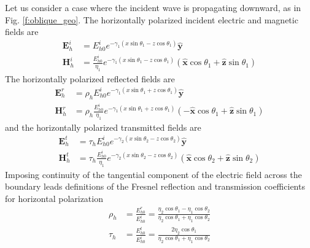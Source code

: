 \documentclass[11pt, oneside]{article}
\begin{document}
Let us consider a case where the incident wave is propagating downward, as in Fig. \ref{f:oblique_geo}. The horizontally polarized incident electric and magnetic fields are 
	\begin{subequations}
	\label{e:obliqueHi1}
	\begin{align}
	\mathbf{E}_h^i &=  E_{h0}^i e^{-\gamma_1\left(x\sin{\theta_1} - z\cos{\theta_1}\right)} \hat{\mathbf{y}} \\
	\mathbf{H}_h^i &= \frac{E_{h0}^i}{\eta_1}
				e^{-\gamma_1\left(x\sin{\theta_1} - z\cos{\theta_1}\right)}\left(\hat{\mathbf{x}}\cos{\theta_1} + \hat{\mathbf{z}}\sin{\theta_1}\right)
	\end{align}
	\end{subequations}
The horizontally polarized reflected fields are
	\begin{subequations}
	\label{e:obliqueHr1}
	\begin{align}
	\mathbf{E}_h^r &=  \rho_hE_{h0}^i e^{-\gamma_1\left(x\sin{\theta_1} + z\cos{\theta_1}\right)} \hat{\mathbf{y}} \\
	\mathbf{H}_h^r &= \rho_h\frac{E_{h0}^i}{\eta_1}
				e^{-\gamma_1\left(x\sin{\theta_1} + z\cos{\theta_1}\right)}\left(-\hat{\mathbf{x}}\cos{\theta_1} + \hat{\mathbf{z}}\sin{\theta_1}\right)
	\end{align}
	\end{subequations}
and the horizontally polarized transmitted fields are
	\begin{subequations}
	\label{e:obliqueHt1}
	\begin{align}
	\mathbf{E}_h^t &= \tau_h E_{h0}^i e^{-\gamma_2\left(x\sin{\theta_2} - z\cos{\theta_2}\right)}\hat{\mathbf{y}} \\
	\mathbf{H}_h^t &= \tau_h\frac{E_{h0}^i}{\eta_1}e^{-\gamma_2\left(x\sin{\theta_2} - z\cos{\theta_2}\right)}
					\left(\hat{\mathbf{x}}\cos{\theta_2} + \hat{\mathbf{z}}\sin{\theta_2}\right)
	\end{align}
	\end{subequations} 
Imposing continuity of the tangential component of the electric field across the boundary leads definitions of the Fresnel reflection and transmission coefficients for horizontal polarization
	\begin{subequations}
	\label{e:oblique_coefs1}
	\begin{align}
	\rho_h &= \frac{E_{h0}^r}{E_{h0}^i} = \frac{\eta_2\cos{\theta_1} - \eta_1\cos{\theta_2}}{\eta_2\cos{\theta_1} + \eta_1\cos{\theta_2}} \\
	\tau_h &= \frac{E_{h0}^t}{E_{h0}^i} = \frac{2\eta_2\cos{\theta_1}}{\eta_2\cos{\theta_1} + \eta_1\cos{\theta_2}}
	\end{align}
	\end{subequations} 
\end{document}

